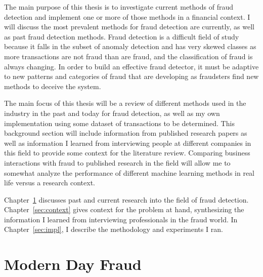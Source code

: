\documentclass[midd]{thesis}
\begin{document}
The main purpose of this thesis is to investigate current methods of fraud detection and implement one or more of those methods in a financial context. I will discuss the most prevalent methods for fraud detection are currently, as well as past fraud detection methods. Fraud detection is a difficult field of study because it falls in the subset of anomaly detection and has very skewed classes as more transactions are not fraud than are fraud, and the classification of fraud is always changing. In order to build an effective fraud detector, it must be adaptive to new patterns and categories of fraud that are developing as fraudsters find new methods to deceive the system.

The main focus of this thesis will be a review of different methods used in the industry in the past and today for fraud detection, as well as my own implementation using some dataset of transactions to be determined. This background section will include information from published research papers as well as information I learned from interviewing people at different companies in this field to provide some context for the literature review. Comparing business interactions with fraud to published research in the field will allow me to somewhat analyze the performance of different machine learning methods in real life versus a research context.  

Chapter~\ref{sec:background} discusses past and current research into the field of fraud detection. Chapter~\ref{sec:context} gives context for the problem at hand, synthesizing the information I learned from interviewing professionals in the fraud world. In Chapter~\ref{sec:impl}, I describe the methodology and experiments I ran.



\pagebreak

\chapter{Modern Day Fraud}
\label{sec:background}
\end{document}
